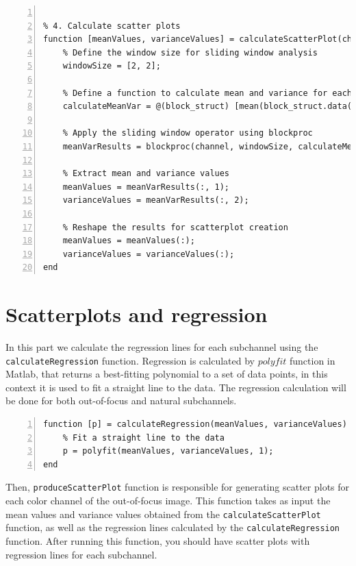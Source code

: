 \documentclass[12pt,a4paper,english
]{tunithesis}
\begin{document}
\begin{lstlisting}[style=Matlab-editor, numbers=left, basicstyle=\small]

% 4. Calculate scatter plots
function [meanValues, varianceValues] = calculateScatterPlot(channel)
    % Define the window size for sliding window analysis
    windowSize = [2, 2];

    % Define a function to calculate mean and variance for each window
    calculateMeanVar = @(block_struct) [mean(block_struct.data(:)), var(block_struct.data(:))];

    % Apply the sliding window operator using blockproc
    meanVarResults = blockproc(channel, windowSize, calculateMeanVar);

    % Extract mean and variance values
    meanValues = meanVarResults(:, 1);
    varianceValues = meanVarResults(:, 2);

    % Reshape the results for scatterplot creation
    meanValues = meanValues(:);
    varianceValues = varianceValues(:);
end
\end{lstlisting}

\section{Scatterplots and regression}
In this part we calculate the regression lines for each subchannel using the \texttt{calculateRegression} function. Regression is calculated by $polyfit$ function in Matlab, that returns a best-fitting polynomial to a set of data points, in this context it is used to fit a straight line to the data. The regression calculation will be done for both out-of-focus and natural subchannels.
\begin{lstlisting}[style=Matlab-editor, numbers=left, basicstyle=\small]
% 5. Calculate regression lines
function [p] = calculateRegression(meanValues, varianceValues)
    % Fit a straight line to the data
    p = polyfit(meanValues, varianceValues, 1);
end
\end{lstlisting}
Then,  \texttt{produceScatterPlot} function is responsible for generating scatter plots for each color channel of the out-of-focus image. This function takes as input the mean values and variance values obtained from the \texttt{calculateScatterPlot} function, as well as the regression lines calculated by the \texttt{calculateRegression} function. After running this function, you should have scatter plots with regression lines for each subchannel.
\end{document}
